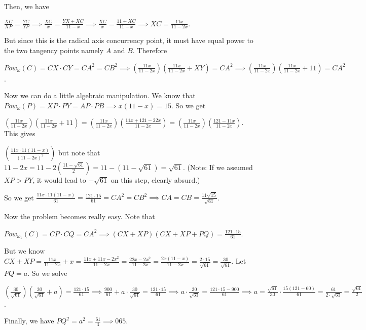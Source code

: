 \begin{enumerate}
 Then, we have

 $\frac{XC}{XP} = \frac{YC}{YP} \implies \frac{XC}{x} = \frac{YX + XC}{11 - x} \implies \frac{XC}{x} = \frac{11 + XC}{11 - x} \implies XC = \frac{11x}{11 - 2x}$.

 But since this is the radical axis concurrency point, it must have equal power to the two tangency points namely $A$ and $B$. Therefore

 $Pow_{\omega}(C) = CX \cdot CY = CA^2 = CB^2 \implies (\frac{11x}{11 - 2x})(\frac{11x}{11 - 2x} + XY) = CA^2 \implies (\frac{11x}{11 - 2x})(\frac{11x}{11 - 2x} + 11) = CA^2$.

 Now we can do a little algebraic manipulation. We know that $Pow_{\omega}(P) = XP \cdot PY = AP \cdot PB \implies x(11 - x) = 15$. So we get

 $(\frac{11x}{11 - 2x})(\frac{11x}{11 - 2x} + 11) = (\frac{11x}{11 - 2x})(\frac{11x + 121 - 22x}{11 - 2x}) = (\frac{11x}{11 - 2x})(\frac{121 - 11x}{11 - 2x})$. This gives

 $(\frac{11x \cdot 11(11 - x)}{(11 - 2x)^2})$ but note that $11 - 2x = 11 - 2(\frac{11 - \sqrt{61}}{2}) = 11 - (11 - \sqrt{61}) = \sqrt{61}$. (Note: If we assumed $XP > PY$, it would lead to $-\sqrt{61}$ on this step, clearly absurd.)

 So we get $\frac{11x \cdot 11(11 - x)}{61} = \frac{121 \cdot 15}{61} = CA^2 = CB^2 \implies CA = CB = \frac{11\sqrt{15}}{\sqrt{61}}$.

 Now the problem becomes really easy. Note that

 $Pow_{\omega_1}(C) = CP \cdot CQ = CA^2 \implies (CX + XP)(CX + XP + PQ) = \frac{121 \cdot 15}{61}$.

 But we know $CX + XP = \frac{11x}{11 - 2x} + x = \frac{11x + 11x - 2x^2}{11 - 2x} = \frac{22x - 2x^2}{11 - 2x} = \frac{2x(11 - x)}{11 - 2x} = \frac{2 \cdot 15}{\sqrt{61}} = \frac{30}{\sqrt{61}}$. Let $PQ = a$. So we solve

 $(\frac{30}{\sqrt{61}})(\frac{30}{\sqrt{61}} + a) = \frac{121 \cdot 15}{61} \implies \frac{900}{61} + a \cdot \frac{30}{\sqrt{61}} = \frac{121 \cdot 15}{61} \implies a \cdot \frac{30}{\sqrt{61}} = \frac{121 \cdot 15 - 900}{61} \implies a = \frac{\sqrt{61}}{30} \cdot \frac{15(121 - 60)}{61} = \frac{61}{2 \cdot \sqrt{61}} = \frac{\sqrt{61}}{2}$.

 Finally, we have $PQ^2 = a^2 = \frac{61}{4} \implies \boxed{065}$.

 


\end{enumerate}